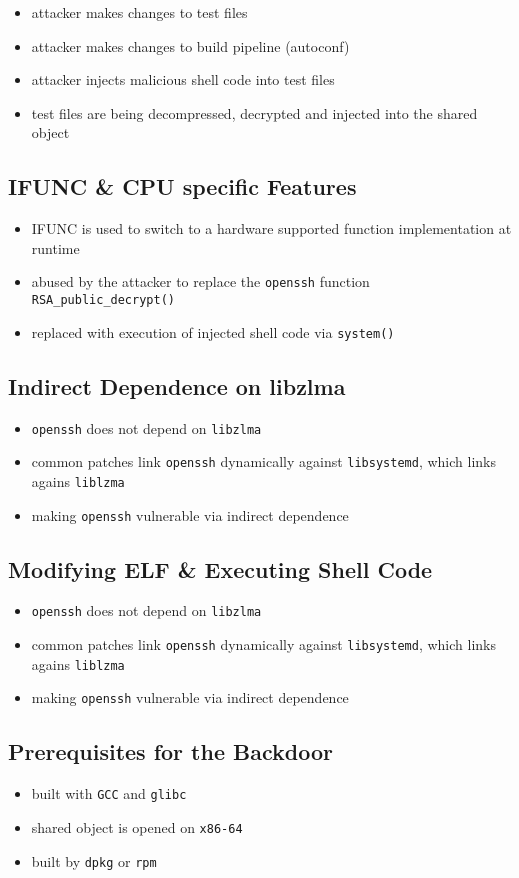 \begin{itemize}
    \item attacker makes changes to test files 
    \item attacker makes changes to build pipeline (autoconf)
    \item attacker injects malicious shell code into test files
    \item test files are being decompressed, decrypted and injected into the shared object 
\end{itemize}

\subsection{IFUNC \& CPU specific Features}

\begin{itemize}
    \item IFUNC is used to switch to a hardware supported function implementation at runtime
    \item abused by the attacker to replace the \texttt{openssh} function \texttt{RSA\_public\_decrypt()}
    \item replaced with execution of injected shell code via \texttt{system()}
\end{itemize}

\subsection{Indirect Dependence on libzlma}

\begin{itemize}
    \item \texttt{openssh} does not depend on \texttt{libzlma}
    \item common patches link \texttt{openssh} dynamically against \texttt{libsystemd}, which links agains \texttt{liblzma}
    \item making \texttt{openssh} vulnerable via indirect dependence
\end{itemize}

\subsection{Modifying ELF \& Executing Shell Code}

\begin{itemize}
    \item \texttt{openssh} does not depend on \texttt{libzlma}
    \item common patches link \texttt{openssh} dynamically against \texttt{libsystemd}, which links agains \texttt{liblzma}
    \item making \texttt{openssh} vulnerable via indirect dependence
\end{itemize}

\subsection{Prerequisites for the Backdoor}

\begin{itemize}
    \item built with \texttt{GCC} and \texttt{glibc}
    \item shared object is opened on \texttt{x86-64}
    \item built by \texttt{dpkg} or \texttt{rpm}
\end{itemize}
